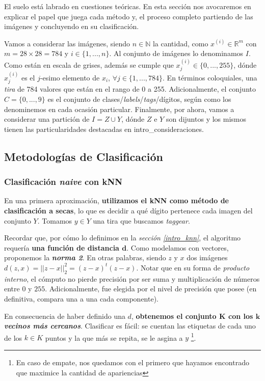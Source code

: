 El suelo est\'a labrado en cuestiones te\'oricas. En esta secci\'on nos avocaremos en explicar el papel que juega cada m\'etodo y, el proceso completo partiendo de las im\'agenes y concluyendo en su clasificaci\'on.

Vamos a considerar las im\'agenes, siendo $n \in \mathbb{N}$ la cantidad, como $x^{(i)} \in \mathbb{R}^{m}$ con $m = 28 \times 28 = 784$ y $i \in \{1, ..., n\}$. Al conjunto de im\'agenes lo denominamos $I$. Como est\'an en escala de grises, adem\'as se cumple que $x^{(i)}_{j} \in \{0, ..., 255\}$, d\'onde $x^{(i)}_{j}$ es el $j$-esimo elemento de $x_{i}$, $\forall j \in \{1, ..., 784\}$. En t\'erminos coloquiales, una \textit{tira} de 784 valores que est\'an en el rango de 0 a 255. Adicionalmente, el conjunto $C = \{0, ..., 9\}$ es el conjunto de clases/\textit{labels}/\textit{tags}/d\'igitos, seg\'un como los denominemos en cada ocasi\'on particular. Finalmente, por ahora, vamos a considerar una partici\'on de $I = Z \cup Y$, d\'onde $Z$ e $Y$ son dijuntos y los mismos tienen las particularidades destacadas en intro_consideraciones.

\subsection{Metodolog\'ias de Clasificaci\'on}

\subsubsection{Clasificaci\'on \textit{naive} con kNN}

En una primera aproximaci\'on, \textbf{utilizamos el kNN como m\'etodo de clasificaci\'on a secas}, lo que es decidir a qu\'e d\'igito pertenece cada imagen del conjunto $Y$. Tomamos $y \in Y$ una tira que buscamos \textit{taggear}.

Recordar que, por c\'omo lo definimos en la \textit{secci\'on \ref{intro_knn}}, el algoritmo requer\'ia \textbf{una funci\'on de distancia $\mathbf{d}$}. Como modelamos con vectores, proponemos la \textbf{\textit{norma 2}}. En otras palabras, siendo $z$ y $x$ dos im\'agenes $d(z,x) = \vert\vert z - x \vert\vert_2^2 = (z - x)^{t}(z - x)$. Notar que en su forma de \textit{producto interno}, el c\'omputo no pierde precisi\'on por ser suma y multiplicaci\'on de n\'umeros entre $0$ y $255$. Adicionalmente, fue elegida por el nivel de precisi\'on que posee (en definitiva, compara una a una cada componente). 

En consecuencia de haber definido una $d$, \textbf{obtenemos el conjunto $\mathbf{K}$ con los \textit{$\mathbf{k}$ vecinos m\'as cercanos}}. Clasificar es f\'acil: se cuentan las etiquetas de cada uno de los $k \in K$ puntos y la que m\'as se repita, se le asgina a $y$ \footnote{En caso de empate, nos quedamos con el primero que hayamos encontrado que maximice la cantidad de apariencias}.

